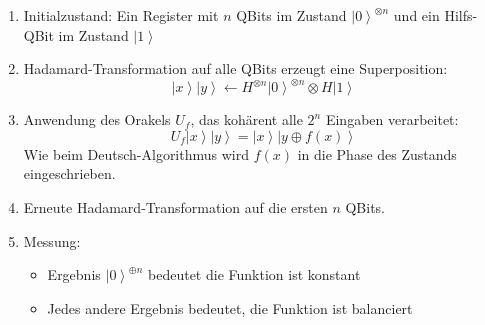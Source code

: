 \begin{enumerate}
\item Initialzustand:  Ein Register mit $n$ QBits im Zustand $\left|0\right\rangle^{\otimes n}$ und ein Hilfs-QBit im Zustand $\left|1\right\rangle$
\item Hadamard-Transformation auf alle QBits erzeugt eine Superposition:
$$
\left|x\right\rangle\left|y\right\rangle \leftarrow  H^{\otimes n}\left|0\right\rangle^{\otimes n} \otimes H\left|1\right\rangle
$$
\item Anwendung des Orakels $U_f$, das kohärent alle $2^n$ Eingaben verarbeitet:
$$
U_f \left|x\right\rangle\left|y\right\rangle = \left|x\right\rangle\left|y \oplus f(x)\right\rangle
$$
    Wie beim Deutsch-Algorithmus wird $f(x)$ in die Phase des Zustands eingeschrieben.
\item Erneute Hadamard-Transformation auf die ersten $n$ QBits.
\item Messung:
    \begin{itemize}
      \item Ergebnis $\left|0\right\rangle^{\oplus n}$ bedeutet die Funktion ist konstant
      \item Jedes andere Ergebnis bedeutet, die Funktion ist balanciert
    \end{itemize}
\end{enumerate}

